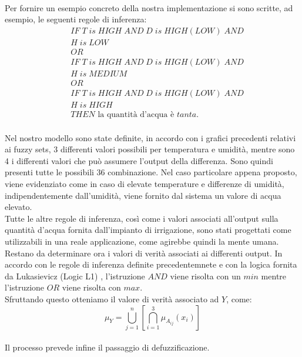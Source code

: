\documentclass[conference,10pt]{IEEEtran}
\begin{document}
\\Per fornire un esempio concreto della nostra implementazione si sono scritte, ad esempio, le seguenti regole di inferenza:\\
\begin{equation*}
\begin{split}
&IF\;T\;is\;HIGH\;AND\;D\;is\;HIGH(LOW)\;AND\\\;&H\;is\;LOW\\
&OR \\
&IF\;T\;is\;HIGH\;AND\;D\;is\;HIGH(LOW)\;AND\\\;&H\;is\;MEDIUM\\
&OR\;\\
&IF\;T\;is\;HIGH\;AND\;D\;is\;HIGH(LOW)\;AND\\\;&H\;is\;HIGH\\
&THEN\text{ la quantità d'acqua è }tanta.
\end{split}
\end{equation*}
\\Nel nostro modello sono state definite, in accordo con i grafici precedenti relativi ai fuzzy sets, 3 differenti valori possibili per temperatura e umidità, mentre sono 4 i differenti valori che può assumere l'output della differenza. Sono quindi presenti tutte le possibili 36 combinazione. Nel caso particolare appena proposto, viene evidenziato come in caso di elevate temperature e differenze di umidità, indipendentemente dall'umidità, viene fornito dal sistema un valore di acqua elevato.
\\Tutte le altre regole di inferenza, così come i valori associati all'output sulla quantità d'acqua fornita dall'impianto di irrigazione, sono stati progettati come utilizzabili in una reale applicazione, come agirebbe quindi la mente umana.\\
Restano da determinare ora i valori di verità associati ai differenti output. In accordo con le regole di inferenza definite precedentemnete e con la logica fornita da Lukasievicz (Logic L1) \cite{10}, l'istruzione $AND$ viene risolta con un $min$ mentre l'istruzione $OR$ viene risolta con $max$.\\
Sfruttando questo otteniamo il valore di verità associato ad $Y$, come:\\
\begin{equation*}
\mu_Y= \bigcup\limits_{j=1}^{n} \left[ \bigcap\limits_{i=1}^{3} \mu_{A_{ij}}\left(x_i \right)  \right] 
\end{equation*}
\\Il processo prevede infine il passaggio di defuzzificazione.\\
\end{document}
